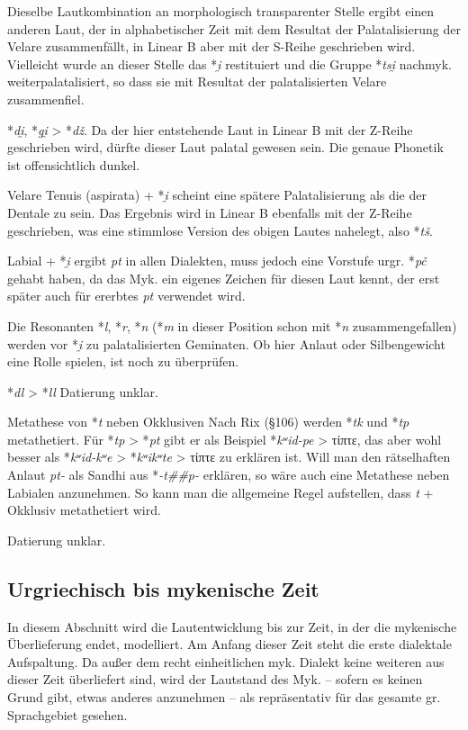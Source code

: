 \documentclass[12pt,a4paper,normalheadings]{scrartcl}
\newcounter{para}
\newcommand{\mypara}[1]{\vspace{1em}\par\noindent\refstepcounter{para}%
\textbf{\textsf{\thepara}}\enspace\textsf{#1}\quad}
\def\rek#1{*\textit{#1}}
\def\bel#1{\textit{#1}}
\begin{document}
Dieselbe Lautkombination an morphologisch transparenter Stelle
ergibt einen anderen Laut,
der in alphabetischer Zeit mit dem Resultat der Palatalisierung der
Velare zusammenfällt,
in Linear B aber mit der S-Reihe geschrieben wird.
Vielleicht wurde an dieser Stelle das \rek{i̯} restituiert
und die Gruppe \rek{tsi̯} nachmyk. weiterpalatalisiert,
so dass sie mit Resultat der palatalisierten Velare zusammenfiel.

\rek{di̯}, \rek{gi̯} > \rek{dž}.
Da der hier entstehende Laut in Linear B mit der Z-Reihe geschrieben wird,
dürfte dieser Laut palatal gewesen sein.
Die genaue Phonetik ist offensichtlich dunkel.

Velare Tenuis (aspirata) + \rek{i̯} scheint eine spätere Palatalisierung
als die der Dentale zu sein.
Das Ergebnis wird in Linear B ebenfalls mit der Z-Reihe geschrieben,
was eine stimmlose Version des obigen Lautes nahelegt,
also \rek{tš}.

Labial + \rek{i̯} ergibt \bel{pt} in allen Dialekten,
muss jedoch eine Vorstufe urgr. \rek{pč} gehabt haben,
da das Myk. ein eigenes Zeichen für diesen Laut kennt,
der erst später auch für ererbtes \bel{pt} verwendet wird.

Die Resonanten \rek{l}, \rek{r}, \rek{n}
(\rek{m} in dieser Position schon mit \rek{n} zusammengefallen)
werden vor \rek{i̯} zu palatalisierten Geminaten.
Ob hier Anlaut oder Silbengewicht eine Rolle spielen, ist noch zu überprüfen.

\mypara{\rek{dl} > \rek{ll}}
Datierung unklar.

\mypara{Metathese von \rek{t} neben Okklusiven}
Nach Rix (§106) werden \rek{tk} und \rek{tp} metathetiert.
Für \rek{tp} > \rek{pt} gibt er als Beispiel \rek{kʷid-pe} > τίπτε,
das aber wohl besser als \rek{kʷid-kʷe} > \rek{kʷikʷte} > τίπτε zu erklären ist.
Will man den rätselhaften Anlaut \bel{pt-}
als Sandhi aus \rek{-t\#\#p-} erklären,
so wäre auch eine Metathese neben Labialen anzunehmen.
So kann man die allgemeine Regel aufstellen, dass \bel{t} + Okklusiv
metathetiert wird.

Datierung unklar.

\subsection{Urgriechisch bis mykenische Zeit}

In diesem Abschnitt wird die Lautentwicklung bis zur Zeit,
in der die mykenische Überlieferung endet, modelliert.
Am Anfang dieser Zeit steht die erste dialektale Aufspaltung.
Da außer dem recht einheitlichen myk. Dialekt keine weiteren aus dieser
Zeit überliefert sind,
wird der Lautstand des Myk.
-- sofern es keinen Grund gibt, etwas anderes anzunehmen --
als repräsentativ für das gesamte gr. Sprachgebiet gesehen.
\end{document}
